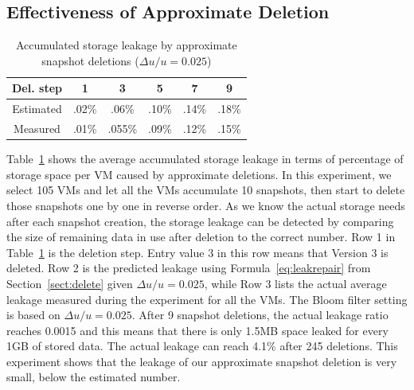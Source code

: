  \subsection{Effectiveness of Approximate Deletion}


\begin{table}
\centering
    \begin{tabular}{|c|c|c|c|c|c|}
    \hline
Del. step   &     1 &  3  & 5 & 7  & 9 \\ 
\hline   
     Estimated& .02\% & .06\% & .10\%& .14\% & .18\%\\ 
\hline   
     Measured & .01\% & .055\% & .09\% & .12\% & .15\% \\
\hline   
    \end{tabular}
     \caption{Accumulated storage leakage by approximate snapshot deletions ($\Delta u/u=0.025$)}
     \label{tab:leakage}
\end{table}

Table~\ref{tab:leakage} shows the average accumulated storage leakage in terms of percentage of
storage space per VM caused  by approximate deletions.
In this experiment, we select 105 VMs and let all the VMs accumulate 10 snapshots, 
then start to delete those snapshots one by one in reverse order.
As we know the actual storage needs after each snapshot creation,
the storage leakage can be detected by
comparing the size of remaining data in use after deletion to the correct number.
Row 1 in  Table~\ref{tab:leakage} 
is the deletion step. Entry value 3 in this row   means that Version 3 is deleted. 
Row  2 is the predicted leakage using Formula~\ref{eq:leakrepair} from Section~\ref{sect:delete}
given $\Delta u/u=0.025$,
while Row 3 lists the actual average leakage measured during the experiment for all the VMs. 
The Bloom filter setting is based on $\Delta u/u=0.025$.
After 9 snapshot deletions, the actual leakage ratio reaches 0.0015 and this means that
there is only 1.5MB space leaked for every 1GB of stored data.
The actual leakage can reach  4.1\% after  245 deletions.
This experiment shows that the leakage of our approximate snapshot deletion is very small, 
below the estimated number.


